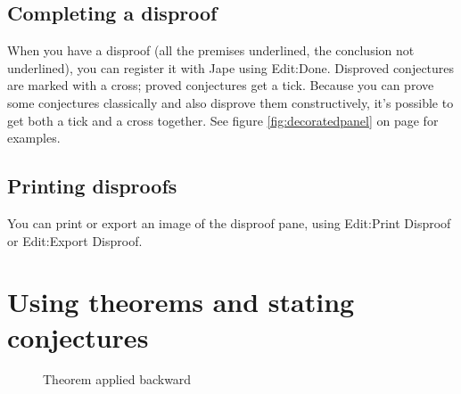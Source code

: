 \documentclass[11pt]{book}
\newcommand{\figref}[1]{figure \ref{fig:#1}}
\begin{document}
\section{Completing a disproof}

When you have a disproof (all the premises underlined, the conclusion not underlined), you can register it with Jape using Edit:Done. Disproved conjectures are marked with a cross; proved conjectures get a tick. Because you can prove some conjectures classically and also disprove them constructively, it's possible to get both a tick and a cross together. See \figref{decoratedpanel} on page \pageref{fig:decoratedpanel} for examples.

\section{Printing disproofs}

You can print or export an image of the disproof pane, using Edit:Print Disproof or Edit:Export Disproof.
 
\chapter{Using theorems and stating conjectures}
\label{chap:theorems}

\begin{figure}
\centering
{}
\qquad
{}
\caption{Theorem applied backward}
\label{fig:theorembackward}
\end{figure}
\end{document}
